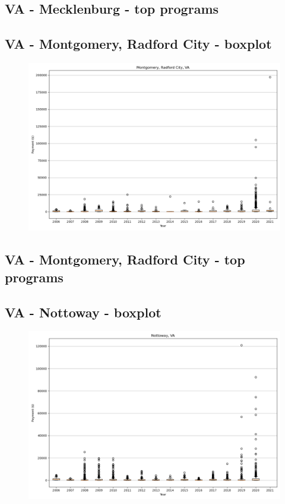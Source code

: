 \subsection*{VA - Mecklenburg - top programs}

\newpage
\subsection*{VA - Montgomery, Radford City - boxplot}
\begin{figure}[h]
\centering
\includegraphics[width=7in]{../output/boxplots/counties/Montgomery, Radford City-VA_boxplot.png}
\end{figure}


\subsection*{VA - Montgomery, Radford City - top programs}

\newpage
\subsection*{VA - Nottoway - boxplot}
\begin{figure}[h]
\centering
\includegraphics[width=7in]{../output/boxplots/counties/Nottoway-VA_boxplot.png}
\end{figure}


